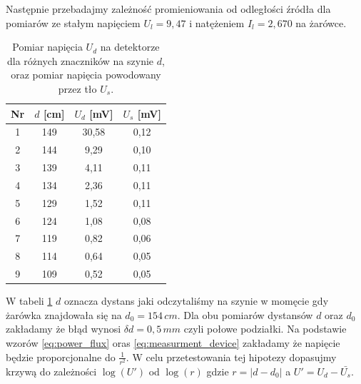 \documentclass[12pt]{article}
\begin{document}
Następnie przebadajmy zależność promieniowania od odległości źródła dla pomiarów ze stałym napięciem $U_l = 9{,}47$ i natężeniem $I_l = 2{,}670$ na żarówce.
\begin{table}[H]
    \centering
    \begin{tabular}{c|c|c|c}
        \toprule
        Nr & $d$ [cm] & $U_d$ [mV] & $U_s$ [mV] \\
        \midrule
        1 & 149 & 30{,}58 & 0{,}12 \\
        2 & 144 & 9{,}29  & 0{,}10 \\
        3 & 139 & 4{,}11  & 0{,}11 \\
        4 & 134 & 2{,}36  & 0{,}11 \\
        5 & 129 & 1{,}52  & 0{,}11 \\
        6 & 124 & 1{,}08  & 0{,}08 \\
        7 & 119 & 0{,}82  & 0{,}06 \\
        8 & 114 & 0{,}64  & 0{,}05 \\
        9 & 109 & 0{,}52  & 0{,}05 \\
        \bottomrule
    \end{tabular}
    \caption{Pomiar napięcia $U_d$ na detektorze dla różnych znaczników na szynie $d$, oraz pomiar napięcia powodowany przez tło $U_s$.}
    \label{tab:distance_measurements}
\end{table}
W tabeli \ref{tab:distance_measurements} $d$ oznacza dystans jaki odczytaliśmy na szynie w momęcie gdy żarówka znajdowała się na $d_0 = 154 \, cm$.
Dla obu pomiarów dystansów $d$ oraz $d_0$ zakładamy że błąd wynosi $\delta d = 0{,}5 \, mm$ czyli połowe podziałki.
Na podstawie wzorów \eqref{eq:power_flux} oras \eqref{eq:measurment_device} zakładamy że napięcie będzie proporcjonalne do $\frac{1}{r^2}$. 
W celu przetestowania tej hipotezy dopasujmy krzywą do zależności $\log(U')$ od $\log(r)$ gdzie $r = |d-d_0|$ a $U' = U_d - \bar{U_s}$.
\end{document}
